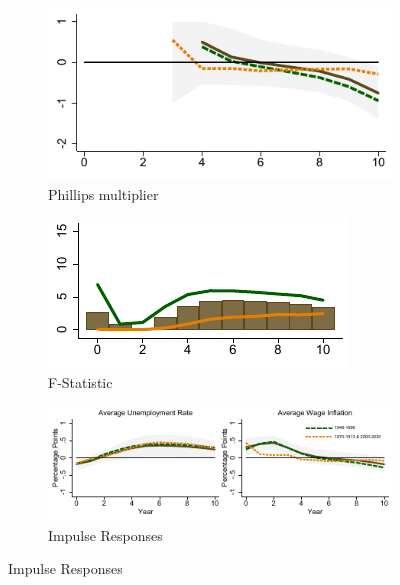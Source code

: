 \documentclass[12pt]{article}
\begin{document}
\begin{figure}[h!]
    \centering
	\caption{State-Dependent Phillips multiplier and IRFs}
	\label{F2:Multiplier_GS}
	\begin{subfigure}[b]{0.45\textwidth}
		\caption{Phillips multiplier}
		\label{F2:Multiplier_M_GS}
		\includegraphics[width=\textwidth]{../Output/Figures/fig_full_SDPMBM_LPIV10_2_asym_postwar.pdf}	
	\end{subfigure}
	\begin{subfigure}[b]{0.45\textwidth}
		\caption{F-Statistic}
		\label{F2:Multiplier_F_GS}
		\includegraphics[width=\textwidth]{../Output/Figures/fig_full_PMBM_F_LPIV10_2_asym_postwar.pdf}
	\end{subfigure}
	\begin{subfigure}[b]{0.9\textwidth}
		\caption{Impulse Responses}
		\label{F2:Dynamics_GS}
		\includegraphics[width=\textwidth]{../Output/Figures/fig_full_SDLPIVBM10_2_asym_postwar.pdf}

\end{subfigure}
\end{figure}
\end{document}
